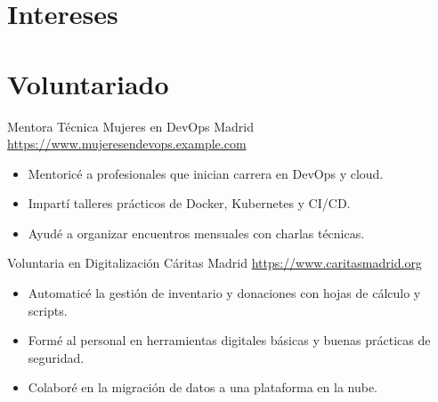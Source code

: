 \documentclass[a4paper, serif, 10pt]{moderncv}
\begin{document}
\section{Intereses}

\section{Voluntariado}

        {Mentora Técnica}
        {Mujeres en DevOps Madrid}
        {\url{https://www.mujeresendevops.example.com}}
        {}
        {\begin{itemize}
\item Mentoricé a profesionales que inician carrera en DevOps y cloud.
\item Impartí talleres prácticos de Docker, Kubernetes y CI/CD.
\item Ayudé a organizar encuentros mensuales con charlas técnicas.
\end{itemize}}
    

        {Voluntaria en Digitalización}
        {Cáritas Madrid}
        {\url{https://www.caritasmadrid.org}}
        {}
        {\begin{itemize}
\item Automaticé la gestión de inventario y donaciones con hojas de cálculo y scripts.
\item Formé al personal en herramientas digitales básicas y buenas prácticas de seguridad.
\item Colaboré en la migración de datos a una plataforma en la nube.
\end{itemize}}
    
\end{document}

